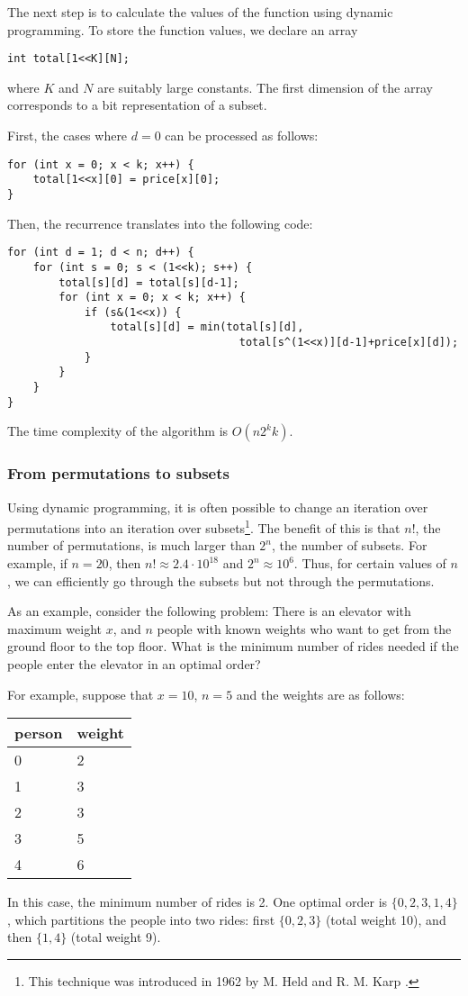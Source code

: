 The next step is to calculate the values of the function
using dynamic programming.
To store the function values, we declare an array
\begin{lstlisting}
int total[1<<K][N];
\end{lstlisting}
where $K$ and $N$ are suitably large constants.
The first dimension of the array corresponds to a bit
representation of a subset.

First, the cases where $d=0$ can be processed as follows:
\begin{lstlisting}
for (int x = 0; x < k; x++) {
    total[1<<x][0] = price[x][0];
}
\end{lstlisting}
Then, the recurrence translates into the following code:
\begin{lstlisting}
for (int d = 1; d < n; d++) {
    for (int s = 0; s < (1<<k); s++) {
        total[s][d] = total[s][d-1];
        for (int x = 0; x < k; x++) {
            if (s&(1<<x)) {
                total[s][d] = min(total[s][d],
                                    total[s^(1<<x)][d-1]+price[x][d]);
            }
        }
    }
}
\end{lstlisting}
The time complexity of the algorithm is $O(n 2^k k)$.

\subsubsection{From permutations to subsets}

Using dynamic programming, it is often possible
to change an iteration over permutations into
an iteration over subsets\footnote{This technique was introduced in 1962
by M. Held and R. M. Karp \cite{hel62}.}.
The benefit of this is that
$n!$, the number of permutations,
is much larger than $2^n$, the number of subsets.
For example, if $n=20$, then
$n! \approx 2.4 \cdot 10^{18}$ and $2^n \approx 10^6$.
Thus, for certain values of $n$,
we can efficiently go through the subsets but not through the permutations.

As an example, consider the following problem:
There is an elevator with maximum weight $x$,
and $n$ people with known weights
who want to get from the ground floor
to the top floor.
What is the minimum number of rides needed
if the people enter the elevator in an optimal order?

For example, suppose that $x=10$, $n=5$
and the weights are as follows:
\begin{center}
\begin{tabular}{ll}
person & weight \\
\hline
0 & 2 \\
1 & 3 \\
2 & 3 \\
3 & 5 \\
4 & 6 \\
\end{tabular}
\end{center}
In this case, the minimum number of rides is 2.
One optimal order is $\{0,2,3,1,4\}$,
which partitions the people into two rides:
first $\{0,2,3\}$ (total weight 10),
and then $\{1,4\}$ (total weight 9).


